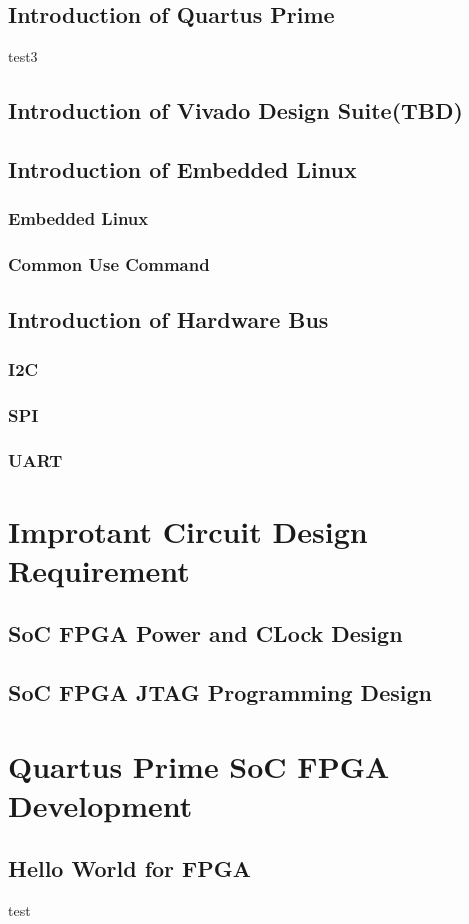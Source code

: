 \documentclass[12pt,article]{memoir}
\begin{document}
\section{Introduction of Quartus Prime}
test3
\section{Introduction of Vivado Design Suite(TBD)}
\section{Introduction of Embedded Linux}
\subsection{Embedded Linux}
\subsection{Common Use Command}
\section{Introduction of Hardware Bus}
\subsection{I2C}
\subsection{SPI}
\subsection{UART}
\chapter{Improtant Circuit Design Requirement}
\section{SoC FPGA Power and CLock Design}
\section{SoC FPGA JTAG Programming Design}
\chapter{Quartus Prime SoC FPGA Development}
\section{Hello World for FPGA}
test
\end{document}
